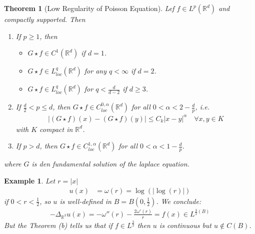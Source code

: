 \documentclass{report}
\theoremstyle{tommy}
\newtheorem{thm}[defn]{Theorem}
\newtheorem{eg}[defn]{Example}
\begin{document}
  \begin{thm}[Low Regularity of Poisson Equation]\label{Low Regularity for Poisson Equation}
    Lef \(f \in L^p(\mathbb{R}^d)\) and compactly supported. Then
    \begin{enumerate}[label=\alph*)]
      \item If \(p \ge 1\), then \begin{itemize}
        \item \(G \star f \in C^1(\mathbb{R}^d)\) if \(d = 1\).
        \item \(G \star f \in L_{loc}^q(\mathbb{R}^d)\) for any \(q < \infty\) if \(d = 2\).
        \item \(G \star f \in L_{loc}^q(\mathbb{R}^d)\) for \(q < \frac{d}{d-2}\) if \(d \ge 3\).
      \end{itemize}
      \item If \(\frac{d}{2} < p \le d\), then \(G \star f \in C_{loc}^{0, \alpha}(\mathbb{R}^d)\) for all \(0 < \alpha < 2 - \frac{d}{p}\), i.e.
      \begin{align*}
        |(G \star f)(x) - (G \star f)(y) | \le C_k|x-y|^\alpha \quad \forall x,y \in K
      \end{align*}
      with \(K\) compact in \(\mathbb{R}^d\).
      \item If \(p > d\), then \(G \star f \in C_{loc}^{1, \alpha} (\mathbb{R}^d)\) for all \(0 < \alpha < 1 - \frac{d}{p}\).
    \end{enumerate}
    where \(G\) is den fundamental solution of the laplace equation.
  \end{thm}
  
  \begin{eg}
    Let \(r = |x|\)
    \begin{align*}
      u(x) 
      &= \omega(r) = \log(|\log(r)|)
    \end{align*}
    if \(0 < r < \frac{1}{2}\), so \(u\) is well-defined in \(B = B(0, \frac{1}{2})\). We conclude:
    \begin{align*}
      - \Delta_{\mathbb{R}^3} u(x) = - \omega''(r) - \frac{2 \omega'(r)}{r} = f(x) \in L^{\frac{3}{2}(B)}
    \end{align*}
    But the Theorem (b) tells us that if \(f \in L^{\frac{3}{2}}\) then \(u\) is continuous but \(u \notin C(B)\).
  \end{eg}
\end{document}
